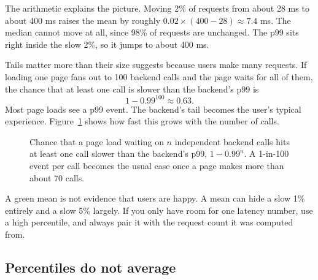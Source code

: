 The arithmetic explains the picture. Moving 2\% of requests from about 28 ms to about
400 ms raises the mean by roughly $0.02 \times (400 - 28) \approx 7.4$ ms. The median
cannot move at all, since 98\% of requests are unchanged. The p99 sits right inside the
slow 2\%, so it jumps to about 400 ms.

Tails matter more than their size suggests because users make many requests. If loading
one page fans out to 100 backend calls and the page waits for all of them, the chance
that at least one call is slower than the backend's p99 is
\[
  1 - 0.99^{100} \approx 0.63 .
\]
Most page loads see a p99 event. The backend's tail becomes the user's typical
experience. Figure~\ref{fig:quantiles-fanout} shows how fast this grows with the number of calls.

\begin{figure}[H]
\centering
{}
\caption{Chance that a page load waiting on $n$ independent backend calls hits at least one
call slower than the backend's p99, $1-0.99^n$. A 1-in-100 event per call becomes the usual
case once a page makes more than about 70 calls.}
\label{fig:quantiles-fanout}
\end{figure}

\begin{trapbox}
A green mean is not evidence that users are happy. A mean can hide a slow 1\% entirely
and a slow 5\% largely. If you only have room for one latency number, use a high
percentile, and always pair it with the request count it was computed from.
\end{trapbox}

\subsection{Percentiles do not average}

